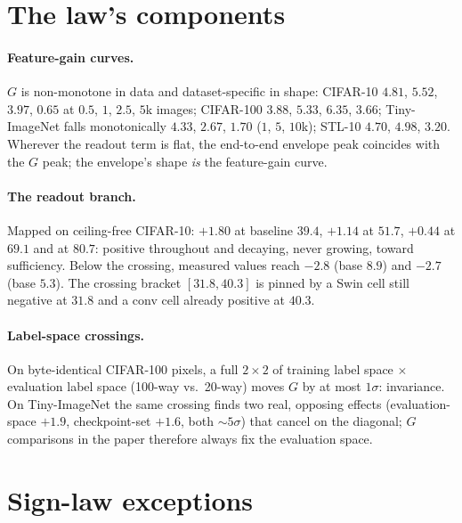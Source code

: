 \section{The law's components}\label{app:law}

\paragraph{Feature-gain curves.} $G$ is non-monotone in data and
dataset-specific in shape: CIFAR-10 $4.81$, $5.52$, $3.97$, $0.65$ at
$0.5$, $1$, $2.5$, $5$k images; CIFAR-100 $3.88$, $5.33$, $6.35$, $3.66$; Tiny-ImageNet
falls monotonically $4.33$, $2.67$, $1.70$ ($1$, $5$, $10$k); STL-10
$4.70$, $4.98$, $3.20$. Wherever the readout term is flat, the end-to-end
envelope peak coincides with the $G$ peak; the envelope's shape
\emph{is} the feature-gain curve.

\paragraph{The readout branch.} Mapped on ceiling-free CIFAR-10:
$+1.80$ at baseline $39.4$, $+1.14$ at $51.7$, $+0.44$ at $69.1$ and at
$80.7$: positive throughout and decaying, never growing, toward
sufficiency. Below the crossing, measured values reach $-2.8$ (base
$8.9$) and $-2.7$ (base $5.3$). The crossing bracket $[31.8, 40.3]$ is
pinned by a Swin cell still negative at $31.8$ and a conv cell already
positive at $40.3$.

\paragraph{Label-space crossings.} On byte-identical CIFAR-100 pixels, a
full $2{\times}2$ of training label space $\times$ evaluation label space
(100-way vs.\ 20-way) moves $G$ by at most $1\sigma$: invariance. On
Tiny-ImageNet the same crossing finds two real, opposing effects
(evaluation-space $+1.9$, checkpoint-set $+1.6$, both ${\sim}5\sigma$) that
cancel on the diagonal; $G$ comparisons in the paper therefore always fix
the evaluation space.

\section{Sign-law exceptions}\label{app:exceptions}

